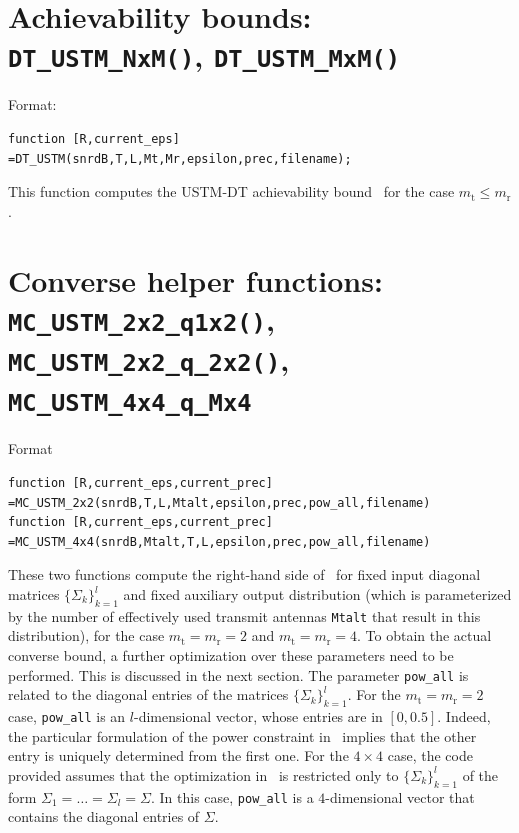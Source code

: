 \documentclass[a4paper,11p]{memoir}
\def\txant{m_{\mathrm{t}}} %
\def\rxant{m_{\mathrm{r}}} %
\def\tfdiv{l}  %
\begin{document}
\section[Achievability bounds]{Achievability bounds: \texttt{DT\_USTM\_NxM()}, \texttt{DT\_USTM\_MxM()}} %
\label{sec:achievability_bound_dt_ustm_nxm}
%
Format:
\begin{verbatim}
function [R,current_eps]
=DT_USTM(snrdB,T,L,Mt,Mr,epsilon,prec,filename);
\end{verbatim}
%
This  function computes the USTM-DT achievability bound~\cite[Th.~3]{durisi14-12a} for the case $\txant\leq \rxant$.

\section[Converse helper functions]{Converse helper functions: \texttt{MC\_USTM\_2x2\_q1x2()}, \texttt{MC\_USTM\_2x2\_q\_2x2()}, \texttt{MC\_USTM\_4x4\_q\_Mx4}} %
\label{sec:converse_bounds__texttt}

Format
%
\begin{verbatim}
function [R,current_eps,current_prec]
=MC_USTM_2x2(snrdB,T,L,Mtalt,epsilon,prec,pow_all,filename)
function [R,current_eps,current_prec]
=MC_USTM_4x4(snrdB,Mtalt,T,L,epsilon,prec,pow_all,filename)
\end{verbatim}
%
These two functions compute the right-hand side of~\cite[Eq.~(41)]{durisi14-12a} for fixed input diagonal matrices $\{\Sigma_k\}_{k=1}^{\tfdiv}$ and fixed auxiliary output distribution (which is parameterized by the number of effectively used transmit antennas \verb|Mtalt| that result in this distribution), for the case $\txant=\rxant=2$ and $\txant=\rxant=4$. 
To obtain the actual converse bound, a further optimization over these parameters need to be performed. This is discussed in the next section.
The parameter \verb|pow_all| is related to the diagonal entries of the matrices $\{\Sigma_k\}_{k=1}^{\tfdiv}$. For the $\txant=\rxant=2$ case, \verb|pow_all| is an $\tfdiv$-dimensional vector, whose entries are in $[0,0.5]$. Indeed, the particular formulation of the power constraint in~\cite[Eq.~(41)]{durisi14-12a} implies that the other entry is uniquely determined from the first one.
For the $4\times 4$ case, the code provided assumes that the optimization in~\cite[Eq.~(41)]{durisi14-12a} is restricted only to $\{\Sigma_k\}_{k=1}^{\tfdiv}$ of the form $\Sigma_1=\dots=\Sigma_\tfdiv=\Sigma$. In this case, \verb|pow_all| is a $4$-dimensional vector that contains the diagonal entries of $\Sigma$.
%
\end{document}
